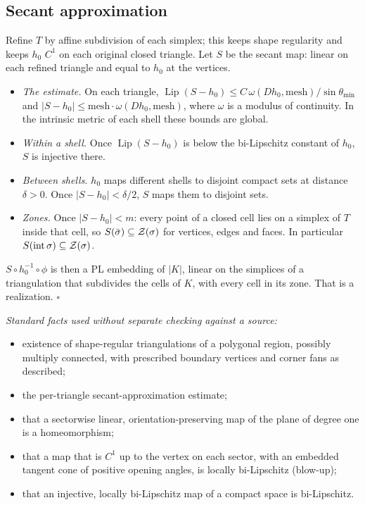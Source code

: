 \subsection{Secant approximation}
Refine $T$ by affine subdivision of each simplex; this keeps shape regularity and keeps $h_0$ $C^1$ on each original
closed triangle. Let $S$ be the secant map: linear on each refined triangle and equal to $h_0$ at the vertices.
\begin{itemize}
\item \emph{The estimate.} On each triangle, $\operatorname{Lip}(S-h_0)\le C\,\omega(Dh_0,\mathrm{mesh})/\sin\theta_{\min}$ and
$|S-h_0|\le\mathrm{mesh}\cdot\omega(Dh_0,\mathrm{mesh})$, where $\omega$ is a modulus of continuity. In the intrinsic
metric of each shell these bounds are global.
\item \emph{Within a shell.} Once $\operatorname{Lip}(S-h_0)$ is below the bi-Lipschitz constant of $h_0$, $S$ is
injective there.
\item \emph{Between shells.} $h_0$ maps different shells to disjoint compact sets at distance $\delta>0$. Once
$|S-h_0|<\delta/2$, $S$ maps them to disjoint sets.
\item \emph{Zones.} Once $|S-h_0|<m$: every point of a closed cell lies on a simplex of $T$ inside that cell, so
$S(\bar\sigma)\subseteq\mathcal{Z}(\sigma)$ for vertices, edges and faces. In particular $S(\operatorname{int}\sigma)\subseteq\mathcal{Z}(\sigma)$.
\end{itemize}
$S\circ h_0^{-1}\circ\phi$ is then a PL embedding of $|K|$, linear on the simplices of a triangulation that subdivides the
cells of $K$, with every cell in its zone. That is a realization. $\square$

\emph{Standard facts used without separate checking against a source:}
\begin{itemize}
\item existence of shape-regular triangulations of a polygonal region, possibly multiply connected, with prescribed
boundary vertices and corner fans as described;
\item the per-triangle secant-approximation estimate;
\item that a sectorwise linear, orientation-preserving map of the plane of degree one is a homeomorphism;
\item that a map that is $C^1$ up to the vertex on each sector, with an embedded tangent cone of positive opening
angles, is locally bi-Lipschitz (blow-up);
\item that an injective, locally bi-Lipschitz map of a compact space is bi-Lipschitz.
\end{itemize}
